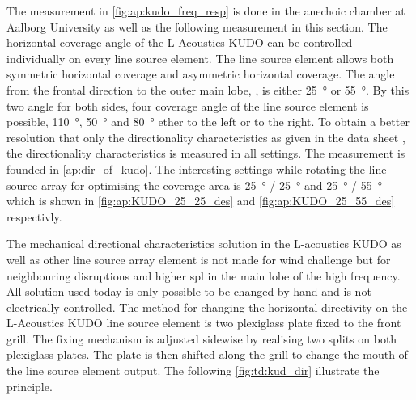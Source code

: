 
The measurement in \autoref{fig:ap:kudo_freq_resp} is done in the anechoic chamber at Aalborg University as well as the following measurement in this section.  The horizontal coverage angle of the L-Acoustics KUDO can be controlled individually on every line source element. The line source element allows both symmetric horizontal coverage and asymmetric horizontal coverage. The angle from the frontal direction to the outer main lobe, , is either \SI{25}{\degree} or \SI{55}{\degree}. By this two angle for both sides, four coverage angle of the line source element is possible, \SI{110}{\degree}, \SI{50}{\degree} and \SI{80}{\degree} ether to the left or to the right. To obtain a better resolution that only the  directionality characteristics as given in the data sheet \citep{KUDO_manual}, the directionality characteristics is measured in all settings. The measurement is founded in \autoref{ap:dir_of_kudo}. The interesting settings while rotating the line source array for optimising the coverage area is \SI{25}{\degree} / \SI{25}{\degree} and \SI{25}{\degree} / \SI{55}{\degree} which is shown in \autoref{fig:ap:KUDO_25_25_des} and \autoref{fig:ap:KUDO_25_55_des} respectivly.



The mechanical directional characteristics solution in the L-acoustics KUDO as well as other line source array element is not made for wind challenge but for neighbouring disruptions and higher \gls{spl} in the main lobe of the high frequency. All solution used today is only possible to be changed by hand and is not electrically controlled. The method for changing the horizontal directivity on the L-Acoustics KUDO line source element is two plexiglass plate fixed to the front grill. The fixing mechanism is adjusted sidewise by realising two splits on both plexiglass plates. The plate is then shifted along the grill to change the mouth of the line source element output. The following \autoref{fig:td:kud_dir} illustrate the principle.

